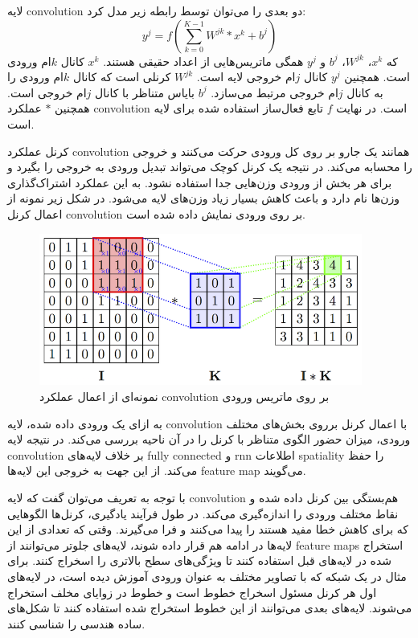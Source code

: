 لایه \gls{convolution} دو بعدی را می‌توان توسط رابطه زیر مدل کرد:
\begin{equation}
    y^j = f(\sum_{k=0}^{K-1} W^{jk} \ast x^k + b^j)
\end{equation}
که $x^k$، $W^{jk}$، $b^j$ و $y^j$ همگی ماتریس‌هایی از اعداد حقیقی هستند. $x^k$
کانال $k$ام ورودی است. همچنین $y^j$ کانال $j$ام خروجی لایه است. $W^{jk}$ کرنلی
است که کانال $k$ام ورودی را به کانال $j$ام خروجی مرتبط می‌سازد. $b^j$ بایاس
متناظر با کانال $j$ام خروجی است. همچنین $\ast$ عملکرد \gls{convolution} است. در
نهایت $f$ تابع فعال‌ساز استفاده شده برای لایه است.

کرنل عملکرد \gls{convolution} همانند یک جارو بر روی کل ورودی حرکت می‌کنند و
خروجی را محسابه می‌کند. در نتیجه یک کرنل کوچک می‌تواند تبدیل ورودی به خروجی را
بگیرد و برای هر بخش از ورودی وزن‌هایی جدا استفاده نشود. به این عملکرد
اشتراک‌گذاری وزن‌ها نام دارد و باعث کاهش بسیار زیاد وزن‌های لایه می‌شود. در شکل
زیر نمونه از اعمال کرنل \gls{convolution} بر روی ورودی نمایش داده شده است.
\begin{figure}[ht]
    \centering
    \includegraphics[height=5cm]{./statics/convolve_operator.png}
    \caption{نمونه‌ای از اعمال عملکرد \gls{convolution} بر روی ماتریس ورودی}
\end{figure}

به ازای یک ورودی داده شده، لایه \gls{convolution} با اعمال کرنل برروی بخش‌های
مختلف ورودی، میزان حضور الگوی متناظر با کرنل را در آن ناحیه بررسی می‌کند. در
نتیجه لایه \gls{convolution} بر خلاف لایه‌های \gls{fully connected} و \gls{rnn}
اطلاعات \gls{spatiality} را حفظ می‌کند. از این جهت به خروجی این لایه‌ها
\gls{feature map} می‌گویند.

با توجه به تعریف می‌توان گفت که لایه \gls{convolution} هم‌بستگی بین کرنل داده
شده و نقاط مختلف ورودی را اندازه‌گیری می‌کند. در طول فرآیند یادگیری، کرنل‌ها
الگوهایی که برای کاهش خطا مفید هستند را پیدا می‌کنند و فرا می‌گیرند. وقتی که
تعدادی از این لایه‌ها در ادامه هم قرار داده شوند، لایه‌های جلوتر می‌توانند از
\glspl{feature map} استخراج شده در لایه‌های قبل استفاده کنند تا ویژگی‌های سطح
بالاتری را اسخراج کنند. برای مثال در یک شبکه که با تصاویر مختلف به عنوان ورودی
آموزش دیده است، در لایه‌های اول هر کرنل مسئول اسخراج خطوط است و خطوط در زوایای
مخلف استخراج می‌شوند. لایه‌های بعدی می‌توانند از این خطوط استخراج شده استفاده
کنند تا شکل‌های ساده هندسی را شناسی کنند.

